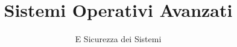 \documentclass[newtx, it, fancy, 11pt, hang]{mybook}
\title{Sistemi Operativi Avanzati}
\subtitle{E Sicurezza dei Sistemi}
\institute{Università di Roma Tor Vergata}
\begin{document}
\maketitle
\frontmatter
\tableofcontents
\mainmatter

\nocite{orangeBook,elegantBook}
\printbibliography[heading=bibintoc]
\end{document}
